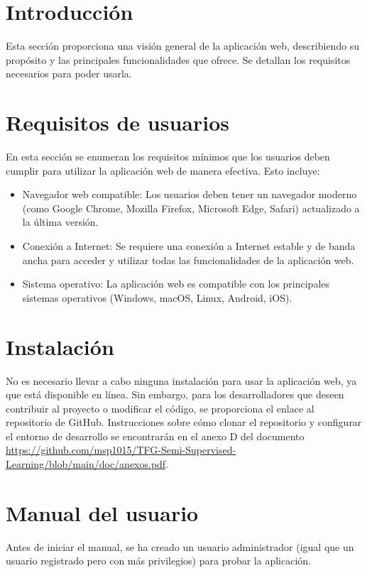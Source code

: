 
\section{Introducción}
Esta sección proporciona una visión general de la aplicación web, describiendo su propósito y las principales funcionalidades que ofrece. Se detallan los requisitos necesarios para poder usarla.

\section{Requisitos de usuarios}
En esta sección se enumeran los requisitos mínimos que los usuarios deben cumplir para utilizar la aplicación web de manera efectiva. Esto incluye:
\begin{itemize}[noitemsep, topsep=5pt]
	\item Navegador web compatible: Los usuarios deben tener un navegador moderno (como Google Chrome, Mozilla Firefox, Microsoft Edge, Safari) actualizado a la última versión.
	\item Conexión a Internet: Se requiere una conexión a Internet estable y de banda ancha para acceder y utilizar todas las funcionalidades de la aplicación web.
	\item Sistema operativo: La aplicación web es compatible con los principales sistemas operativos (Windows, macOS, Linux, Android, iOS).
\end{itemize}

\section{Instalación}
No es necesario llevar a cabo ninguna instalación para usar la aplicación web, ya que está disponible en línea. Sin embargo, para los desarrolladores que deseen contribuir al proyecto o modificar el código, se proporciona el enlace al repositorio de GitHub. Instrucciones sobre cómo clonar el repositorio y configurar el entorno de desarrollo se encontrarán en el anexo D del documento \url{https://github.com/msp1015/TFG-Semi-Supervised-Learning/blob/main/doc/anexos.pdf}.


\section{Manual del usuario}
Antes de iniciar el manual, se ha creado un usuario administrador (igual que un
usuario registrado pero con más privilegios) para probar la aplicación.

